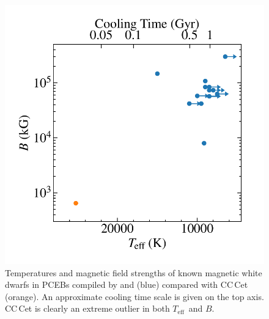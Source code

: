 \documentclass[fleqn,usenatbib]{mnras}
\newcommand{\Teff}{\mbox{$T_{\mathrm{eff}}$}}
\begin{document}
\begin{figure}
    \centering
    \includegraphics[width=8 cm]{teffvB.pdf}
    \caption{Temperatures and magnetic field strengths of known magnetic white dwarfs in PCEBs compiled by \citet{ferrarioetal15-1} and \citet{parsonsetal21-1} (blue) compared with CC\,Cet (orange). An approximate cooling time scale is given on the top axis. CC\,Cet is clearly an extreme outlier in both \Teff\ and $B$.}
    \label{fig:teffB}
\end{figure}
\end{document}
